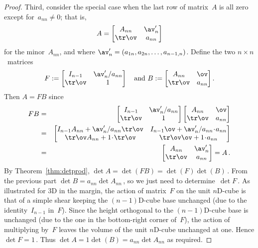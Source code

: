\begin{proof}
Third, consider the special case when the last row of matrix~\(A\) is all zero except for~\(a_{nn}\neq0\); that is, 
\begin{equation*}
A=\begin{bmatrix} A_{nn}&\av_n'\\\tr\ov&a_{nn} \end{bmatrix}
\end{equation*}
for the minor~\(A_{nn}\), and where \(\av'_n=(a_{1n},a_{2n},\ldots,a_{n-1,n})\).
Define the two \(n\times n\)~matrices
\begin{equation*}
F:=\begin{bmatrix} I_{n-1}&\av'_n/a_{nn}\\\tr\ov& 1 \end{bmatrix}
\quad\text{and }
B:=\begin{bmatrix} A_{nn}&\ov\\\tr\ov&a_{nn} \end{bmatrix}.
\end{equation*}
Then \(A=FB\) since
\begin{eqnarray*}
FB&=&\begin{bmatrix} I_{n-1}&\av'_n/a_{nn}\\\tr\ov& 1 \end{bmatrix}
\begin{bmatrix} A_{nn}&\ov\\\tr\ov&a_{nn} \end{bmatrix}
\\&=&\begin{bmatrix} I_{n-1}A_{nn}+\av'_n/a_{nn}\tr\ov &
I_{n-1}\ov+\av'_n/a_{nn}\cdot a_{nn}\\
\tr\ov A_{nn}+1\cdot\tr\ov &
\tr\ov\ov+1\cdot a_{nn}  \end{bmatrix}
\\&=&\begin{bmatrix} A_{nn} &
\av'_n\\
\tr\ov  &
a_{nn}  \end{bmatrix} =A\,.
\end{eqnarray*}
By Theorem~\ref{thm:detprod}, \(\det A=\det(FB)=\det(F)\det(B)\)\,.
From the previous part \(\det B=a_{nn}\det A_{nn}\)\,, so we just need to determine~\(\det F\)\,.
As illustrated for 3D in the margin, the action of matrix~\(F\) on the unit \(n\)D-cube is that of a simple shear keeping the \((n-1)\)D-cube base unchanged (due to the identity~\(I_{n-1}\) in~\(F\)).
Since the height orthogonal to the \((n-1)\)D-cube base is unchanged (due to the one in the bottom-right corner of~\(F\)), the action of multiplying by~\(F\) leaves the volume of the unit \(n\)D-cube unchanged at one.
Hence \(\det F=1\)\,.
Thus \(\det A=1\det(B)=a_{nn}\det A_{nn}\) as required.


\end{proof}
